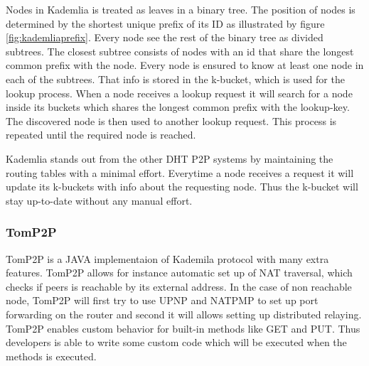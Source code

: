 Nodes in Kademlia is treated as leaves in a binary tree. The position of nodes is determined by the shortest unique prefix of its ID as illustrated by figure \ref{fig:kademliaprefix}. Every node see the rest of the binary tree as divided subtrees. The closest subtree consists of nodes with an id that share the longest common prefix with the node. Every node is ensured to know at least one node in each of the subtrees. That info is stored in the k-bucket, which is used for the lookup process. When a node receives a lookup request it will search for a node inside its buckets which shares the longest common prefix with the lookup-key. The discovered node is then used to another lookup request. This process is repeated until the required node is reached.

Kademlia stands out from the other DHT P2P systems by maintaining the routing tables with a minimal effort. Everytime a node receives a request it will update its k-buckets with info about the requesting node. Thus the k-bucket will stay up-to-date without any manual effort.



\subsubsection{TomP2P}
TomP2P is a JAVA implementaion of Kademila protocol with many extra features. TomP2P allows for instance automatic set up of NAT traversal, which checks if peers is reachable by its external address. In the case of non reachable node, TomP2P will first try to use UPNP and NATPMP to set up port forwarding on the router and second it will allows setting up distributed relaying. TomP2P enables custom behavior for built-in methods like GET and PUT. Thus developers is able to write some custom code which will be executed when the methods is executed.



